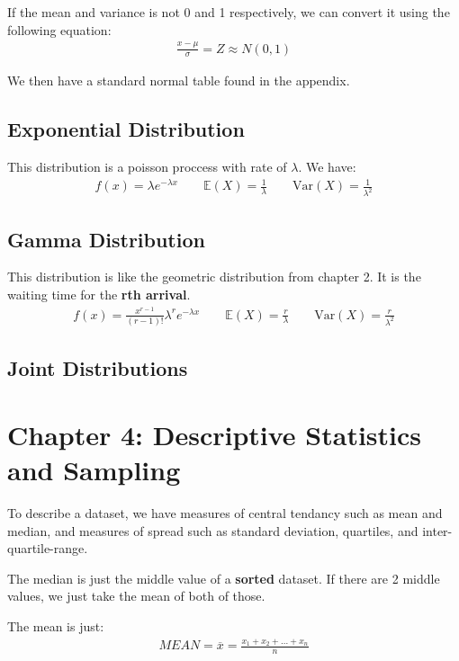 \documentclass[12pt,letterpaper]{article} \usepackage{amsmath} \usepackage{graphicx} \usepackage[margin=1in]{geometry} \usepackage{longtable}  \usepackage{amssymb}
\begin{document}
	If the mean and variance is not 0 and 1 respectively, we can convert it using the following equation:
	\begin{align*}
		\frac{x-\mu}{\sigma} = Z \approx N(0,1)
	\end{align*}

	We then have a standard normal table found in the appendix. 
	
	\subsection{Exponential Distribution}
	This distribution is a poisson proccess with rate of $\lambda$. We have:
	\begin{align*}
		f(x) = \lambda e^{-\lambda x}  \qquad \mathbb E(X)=\frac{1}{\lambda} \qquad \text{Var}(X) = \frac{1}{\lambda^2}
	\end{align*}
	
	\subsection{Gamma Distribution}
	This distribution is like the geometric distribution from chapter 2. It is the waiting time for the \textbf{rth arrival}. 
	\begin{align*}
		f(x) = \frac{x^{r-1}}{(r-1)!}\lambda^re^{-\lambda x}  \qquad \mathbb E(X)=\frac{r}{\lambda} \qquad \text{Var}(X) = \frac{r}{\lambda^2}
	\end{align*}
	
	\subsection{Joint Distributions}
	
	\section{Chapter 4: Descriptive Statistics and Sampling}
	To describe a dataset, we have measures of central tendancy such as mean and median, and measures of spread such as standard deviation, quartiles, and inter-quartile-range. 
	
	The median is just the middle value of a \textbf{sorted} dataset. If there are 2 middle values, we just take the mean of both of those. 
	
	The mean is just:
	\begin{align*}
		MEAN = \overline{x} = \frac{x_1 + x_2 + ... + x_n}{n}
	\end{align*}
\end{document}
